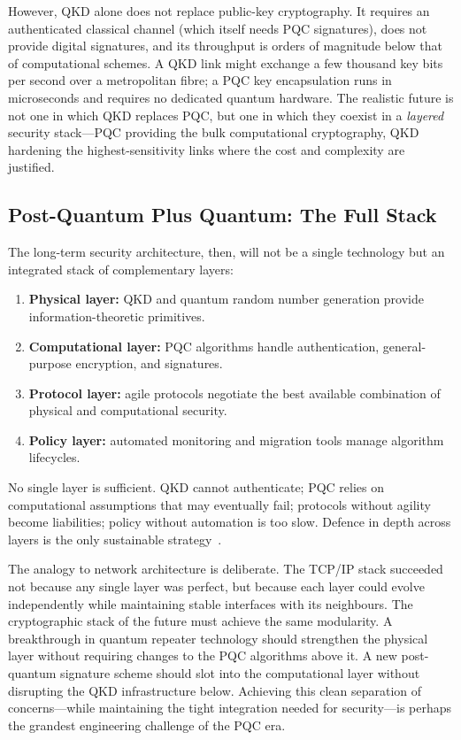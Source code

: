 However, QKD alone does not replace public-key cryptography.  It requires an authenticated classical channel (which itself needs PQC signatures), does not provide digital signatures, and its throughput is orders of magnitude below that of computational schemes.  A QKD link might exchange a few thousand key bits per second over a metropolitan fibre; a PQC key encapsulation runs in microseconds and requires no dedicated quantum hardware.  The realistic future is not one in which QKD replaces PQC, but one in which they coexist in a \emph{layered} security stack---PQC providing the bulk computational cryptography, QKD hardening the highest-sensitivity links where the cost and complexity are justified.

\subsection{Post-Quantum Plus Quantum: The Full Stack}
\label{subsec:full-stack}

The long-term security architecture, then, will not be a single technology but an integrated stack of complementary layers:
\begin{enumerate}
\item \textbf{Physical layer:} QKD and quantum random number generation provide information-theoretic primitives.
\item \textbf{Computational layer:} PQC algorithms handle authentication, general-purpose encryption, and signatures.
\item \textbf{Protocol layer:} agile protocols negotiate the best available combination of physical and computational security.
\item \textbf{Policy layer:} automated monitoring and migration tools manage algorithm lifecycles.
\end{enumerate}

No single layer is sufficient.  QKD cannot authenticate; PQC relies on computational assumptions that may eventually fail; protocols without agility become liabilities; policy without automation is too slow.  Defence in depth across layers is the only sustainable strategy~\cite{Peikert2016}.

The analogy to network architecture is deliberate.  The TCP/IP stack succeeded not because any single layer was perfect, but because each layer could evolve independently while maintaining stable interfaces with its neighbours.  The cryptographic stack of the future must achieve the same modularity.  A breakthrough in quantum repeater technology should strengthen the physical layer without requiring changes to the PQC algorithms above it.  A new post-quantum signature scheme should slot into the computational layer without disrupting the QKD infrastructure below.  Achieving this clean separation of concerns---while maintaining the tight integration needed for security---is perhaps the grandest engineering challenge of the PQC era.

